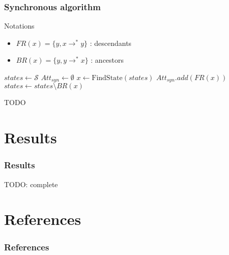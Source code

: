 \documentclass{beamer}
\begin{document}
\begin{frame}
\frametitle{Synchronous algorithm}

\begin{block}{Notations}
\begin{itemize}
\item $FR(x) = \{ y,  x \rightarrow^* y \}$ : descendants 
\item $BR(x) = \{ y, y \rightarrow^* x \} $ : ancestors
\end{itemize}
\end{block}

\bigskip
\begin{algorithmic}
\State $states \gets \mathcal S$
\State $Att_{syn} \gets \emptyset$
	\State $x \gets \text{FindState}(states)$
	\State $Att_{syn}.add(FR(x))$
	\State $states \gets states \setminus BR(x)$
\EndWhile
\end{algorithmic}


\end{frame}

\begin{frame}
\end{frame}

\begin{frame}
	TODO 

\end{frame}



\section{Results}

\begin{frame}
  \frametitle{Results}
  TODO: complete
\end{frame}


\section*{References}

\begin{frame}
  \frametitle{References}
  
  
\end{frame}
\end{document}
